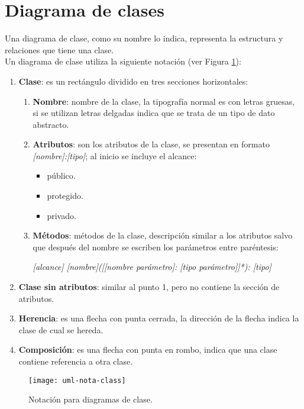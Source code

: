 \section{Diagrama de clases}\label{sec:uml-class}
Una diagrama de clase, como su nombre lo indica, representa la estructura y relaciones que tiene una clase\cite{UMLClassroom, SoftwareEngineeringUML}.\\
Un diagrama de clase utiliza la siguiente notación\cite{UMLClassroom, SoftwareEngineeringUML} (ver Figura \ref{fig:uml-nota-class}):
\begin{enumerate}
  \item \textbf{Clase}: es un rectángulo dividido en tres secciones horizontales:
  \begin{enumerate}
     \item[1.] \textbf{Nombre}: nombre de la clase, la tipografía normal es con letras gruesas, si se utilizan letras delgadas indica que se trata de un tipo de dato abstracto. 
     \item[2.] \textbf{Atributos}: son los atributos de la clase, se presentan en formato \textit{[nombre]:[tipo]}; al inicio se incluye el alcance:
     \begin{itemize}
       \item [+] público.
       \item [\#] protegido.
       \item [-] privado.
     \end{itemize}
     \item[3.] \textbf{Métodos}: métodos de la clase, descripción similar a los atributos salvo que después del nombre se escriben los parámetros entre paréntesis:
     \begin{center}
       \textit{[alcance] [nombre]([[nombre parámetro]: [tipo parámetro]]*): [tipo]}
     \end{center}
   \end{enumerate} 
  \item \textbf{Clase sin atributos}: similar al punto 1, pero no contiene la sección de atributos.
  \item \textbf{Herencia}: es una flecha con punta cerrada, la dirección de la flecha indica la clase de cual se hereda.
  \item \textbf{Composición}: es una flecha con punta en rombo, indica que una clase contiene referencia a otra clase.
\end{enumerate}

\begin{figure}[h]
  \centering
  \texttt{[image: uml-nota-class]}
  \caption{Notación para diagramas de clase\cite{SoftwareEngineeringUML}.}
  \label{fig:uml-nota-class}
\end{figure}
